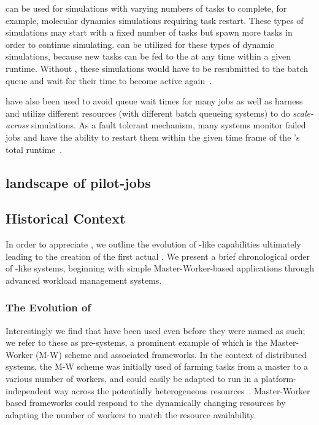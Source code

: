 \documentclass{sig-alternate}
\begin{document}
\pilotjobs can be used for  simulations
 with varying numbers of tasks to complete, for example,
molecular dynamics simulations requiring task restart. These types of
 simulations may start with a fixed number of tasks but spawn
 more tasks in order to continue simulating. \pilotjobs can be
utilized for these types of dynamic simulations, because
new tasks can be fed to the \pilot at any time within a given
runtime. Without \pilotjobs, these simulations would have to
be resubmitted to the batch queue and wait for their time
to become active again~\cite{luckow2009adaptive}.

\pilotjobs have also been used to avoid queue wait times for many jobs
as well as harness and utilize different resources (with different
batch queueing systems) to do \textit{scale-across} simulations.
As a fault tolerant mechanism, many \pilotjob systems monitor
failed jobs and have the ability to restart them within the given
time frame of the \pilotjob's total runtime~\cite{1742-6596-219-6-062049,condor-g,nilsson2011atlas}.

\subsection{landscape of pilot-jobs}\label{ssec:landscape}


\subsection{Historical Context}\label{ssec:history}

In order to appreciate \pilotjobs, we outline the evolution of
\pilot-like capabilities ultimately leading to the creation of the
first actual \pilotjob. We present a brief chronological order of
\pilotjob-like systems, beginning with simple Master-Worker-based
applications through advanced workload management systems.

\subsubsection*{The Evolution of \pilotjobs}\label{sssec:evolution}


Interestingly we find that \pilotjobs have been used even before they
were named as such; we refer to these as pre-\pilotjob systems, a
prominent example of which is the Master-Worker (M-W) scheme and
associated frameworks.  In the context of distributed systems, the M-W
scheme was initially used of farming tasks from a master to a various
number of workers, and could easily be adapted to run in a
platform-independent way across the potentially heterogeneous
resources~\cite{masterworker, Goux00anenabling}. Master-Worker based
frameworks could respond to the dynamically changing resources by
adapting the number of workers to match the resource availability.
\end{document}
